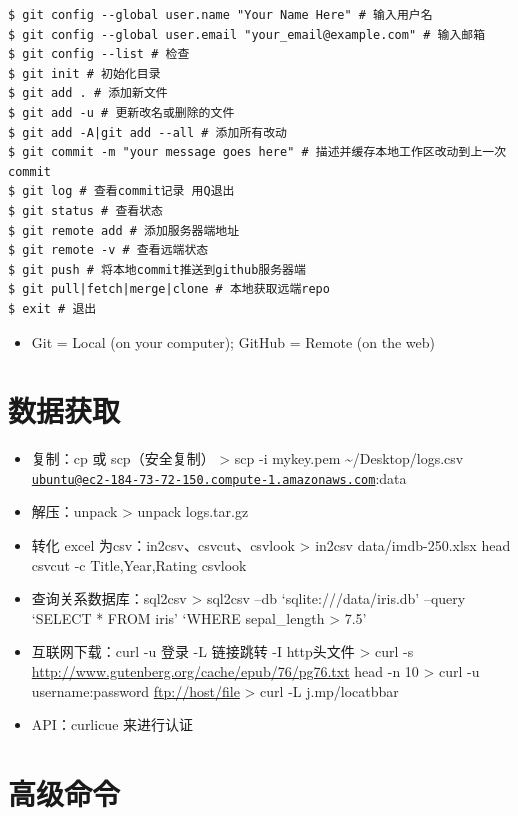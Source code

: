 \documentclass[]{book}
\providecommand{\tightlist}{%
  \setlength{\itemsep}{0pt}\setlength{\parskip}{0pt}}
\begin{document}
\begin{verbatim}
$ git config --global user.name "Your Name Here" # 输入用户名
$ git config --global user.email "your_email@example.com" # 输入邮箱
$ git config --list # 检查
$ git init # 初始化目录
$ git add . # 添加新文件
$ git add -u # 更新改名或删除的文件
$ git add -A|git add --all # 添加所有改动
$ git commit -m "your message goes here" # 描述并缓存本地工作区改动到上一次commit
$ git log # 查看commit记录 用Q退出
$ git status # 查看状态
$ git remote add # 添加服务器端地址
$ git remote -v # 查看远端状态
$ git push # 将本地commit推送到github服务器端
$ git pull|fetch|merge|clone # 本地获取远端repo
$ exit # 退出
\end{verbatim}

\begin{itemize}
\tightlist
\item
  Git = Local (on your computer); GitHub = Remote (on the web)
\end{itemize}

\section{数据获取}

\begin{itemize}
\item
  复制：cp 或 scp（安全复制）
  \textgreater{} scp -i mykey.pem \textasciitilde{}/Desktop/logs.csv \href{mailto:ubuntu@ec2-184-73-72-150.compute-1.amazonaws.com}{\nolinkurl{ubuntu@ec2-184-73-72-150.compute-1.amazonaws.com}}:data
\item
  解压：unpack
  \textgreater{} unpack logs.tar.gz
\item
  转化 excel 为csv：in2csv、csvcut、csvlook
  \textgreater{} in2csv data/imdb-250.xlsx \textbar{} head \textbar{} csvcut -c Title,Year,Rating \textbar{} csvlook
\item
  查询关系数据库：sql2csv
  \textgreater{} sql2csv --db `sqlite:///data/iris.db' --query `SELECT * FROM iris' `WHERE sepal\_length \textgreater{} 7.5'
\item
  互联网下载：curl -u 登录 -L 链接跳转 -I http头文件
  \textgreater{} curl -s \url{http://www.gutenberg.org/cache/epub/76/pg76.txt} \textbar{} head -n 10
  \textgreater{} curl -u username:password \url{ftp://host/file}
  \textgreater{} curl -L j.mp/locatbbar
\item
  API：curlicue 来进行认证
\end{itemize}

\section{高级命令}
\end{document}
